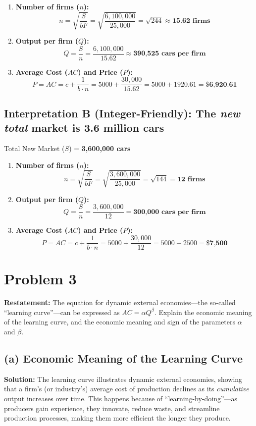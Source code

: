 \documentclass[11pt, letterpaper]{article}
\begin{document}
\begin{enumerate}[label=\textbf{\alph*.}]
  \item \textbf{Number of firms ($n$):}
    $$n = \sqrt{\frac{S}{bF}} = \sqrt{\frac{6,100,000}{25,000}} = \sqrt{244} \approx \textbf{15.62 firms}$$

  \item \textbf{Output per firm ($Q$):}
    $$Q = \frac{S}{n} = \frac{6,100,000}{15.62} \approx \textbf{390,525 cars per firm}$$

  \item \textbf{Average Cost ($AC$) and Price ($P$):}
    $$P = AC = c + \frac{1}{b \cdot n} = 5000 + \frac{30,000}{15.62} = 5000 + 1920.61 = \textbf{\$6,920.61}$$
\end{enumerate}

\subsection*{Interpretation B (Integer-Friendly): The \textit{new total} market is 3.6 million cars}
Total New Market ($S$) = \textbf{3,600,000 cars}

\begin{enumerate}[label=\textbf{\alph*.}]
  \item \textbf{Number of firms ($n$):}
    $$n = \sqrt{\frac{S}{bF}} = \sqrt{\frac{3,600,000}{25,000}} = \sqrt{144} = \textbf{12 firms}$$

  \item \textbf{Output per firm ($Q$):}
    $$Q = \frac{S}{n} = \frac{3,600,000}{12} = \textbf{300,000 cars per firm}$$

  \item \textbf{Average Cost ($AC$) and Price ($P$):}
    $$P = AC = c + \frac{1}{b \cdot n} = 5000 + \frac{30,000}{12} = 5000 + 2500 = \textbf{\$7,500}$$
\end{enumerate}

\vspace{1em}
\section*{Problem 3}

\textbf{Restatement:} The equation for dynamic external economies---the so-called ``learning curve''---can be expressed as $AC = \alpha Q^\beta$. Explain the economic meaning of the learning curve, and the economic meaning and sign of the parameters $\alpha$ and $\beta$.

\subsection*{(a) Economic Meaning of the Learning Curve}
\noindent \textbf{Solution:}
The learning curve illustrates dynamic external economies, showing that a firm's (or industry's) average cost of production declines as its \textit{cumulative} output increases over time. This happens because of ``learning-by-doing''---as producers gain experience, they innovate, reduce waste, and streamline production processes, making them more efficient the longer they produce.
\end{document}
